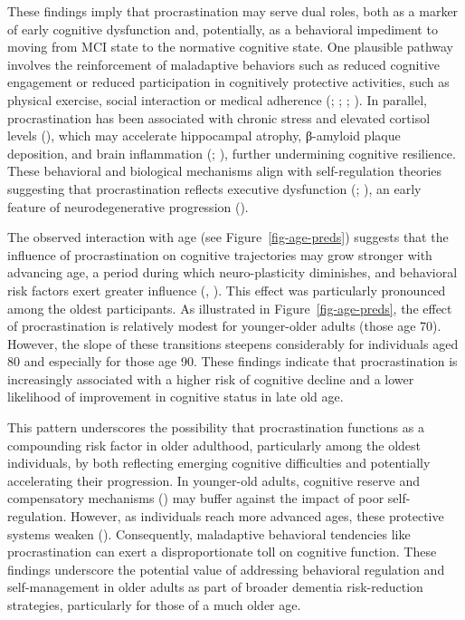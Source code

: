 \documentclass[
]{article}
\begin{document}
These findings imply that procrastination may serve dual roles, both as
a marker of early cognitive dysfunction and, potentially, as a
behavioral impediment to moving from MCI state to the normative
cognitive state. One plausible pathway involves the reinforcement of
maladaptive behaviors such as reduced cognitive engagement or reduced
participation in cognitively protective activities, such as physical
exercise, social interaction or medical adherence
(;
;
; ). In parallel, procrastination has been associated with
chronic stress and elevated cortisol levels
(), which may accelerate
hippocampal atrophy, β-amyloid plaque deposition, and brain inflammation
(;
), further
undermining cognitive resilience. These behavioral and biological
mechanisms align with self-regulation theories suggesting that
procrastination reflects executive dysfunction
(;
), an early feature of
neurodegenerative progression ().

The observed interaction with age (see Figure~\ref{fig-age-preds})
suggests that the influence of procrastination on cognitive trajectories
may grow stronger with advancing age, a period during which
neuro-plasticity diminishes, and behavioral risk factors exert greater
influence (,
). This effect was particularly
pronounced among the oldest participants. As illustrated in
Figure~\ref{fig-age-preds}, the effect of procrastination is relatively
modest for younger-older adults (those age 70). However, the slope of
these transitions steepens considerably for individuals aged 80 and
especially for those age 90. These findings indicate that
procrastination is increasingly associated with a higher risk of
cognitive decline and a lower likelihood of improvement in cognitive
status in late old age.

This pattern underscores the possibility that procrastination functions
as a compounding risk factor in older adulthood, particularly among the
oldest individuals, by both reflecting emerging cognitive difficulties
and potentially accelerating their progression. In younger-old adults,
cognitive reserve and compensatory mechanisms
() may buffer against
the impact of poor self-regulation. However, as individuals reach more
advanced ages, these protective systems weaken
(). Consequently,
maladaptive behavioral tendencies like procrastination can exert a
disproportionate toll on cognitive function. These findings underscore
the potential value of addressing behavioral regulation and
self-management in older adults as part of broader dementia
risk-reduction strategies, particularly for those of a much older age.
\end{document}
